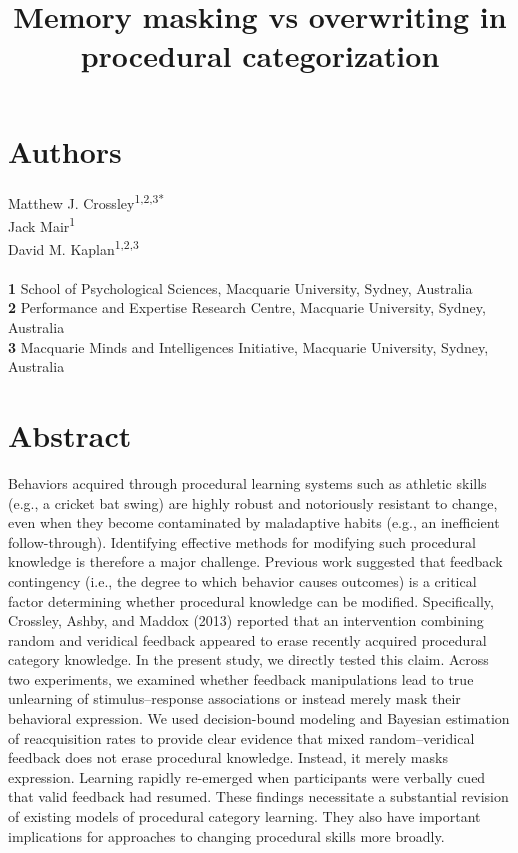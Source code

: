 \documentclass{article}
\title{Memory masking vs overwriting in procedural categorization}
\author{}
\date{}
\begin{document}
\maketitle

\section{Authors}
Matthew J. Crossley\textsuperscript{1,2,3*}\\
Jack Mair\textsuperscript{1}\\
David M. Kaplan\textsuperscript{1,2,3}\\\\
\textbf{1} School of Psychological Sciences, Macquarie University, Sydney, Australia \\
\textbf{2} Performance and Expertise Research Centre, Macquarie University, Sydney, Australia \\
\textbf{3} Macquarie Minds and Intelligences Initiative, Macquarie University, Sydney, Australia

\section{Abstract}
Behaviors acquired through procedural learning systems such
as athletic skills (e.g., a cricket bat swing) are highly
robust and notoriously resistant to change, even when they
become contaminated by maladaptive habits (e.g., an
inefficient follow-through). Identifying effective methods
for modifying such procedural knowledge is therefore a major
challenge. Previous work suggested that feedback contingency
(i.e., the degree to which behavior causes outcomes) is a
critical factor determining whether procedural knowledge can
be modified. Specifically, Crossley, Ashby, and Maddox
(2013) reported that an intervention combining random and
veridical feedback appeared to erase recently acquired
procedural category knowledge. In the present study, we
directly tested this claim. Across two experiments, we
examined whether feedback manipulations lead to true
unlearning of stimulus–response associations or instead
merely mask their behavioral expression. We used
decision-bound modeling and Bayesian estimation of
reacquisition rates to provide clear evidence that mixed
random–veridical feedback does not erase procedural
knowledge. Instead, it merely masks expression.  Learning
rapidly re-emerged when participants were verbally cued that
valid feedback had resumed. These findings necessitate a
substantial revision of existing models of procedural
category learning. They also have important implications for
approaches to changing procedural skills more broadly.
\end{document}
